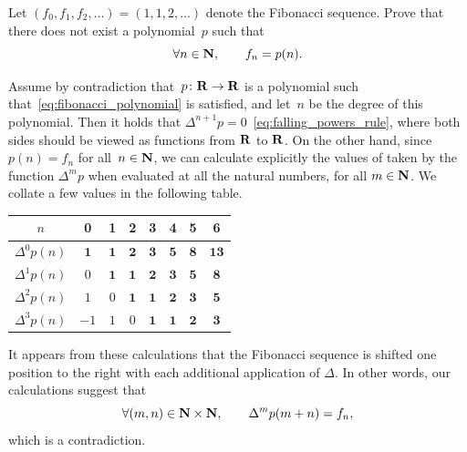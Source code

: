 \begin{exercise}
    Let $(f_0, f_1, f_2, \dotsc) = (1, 1, 2, \dotsc)$ denote the Fibonacci sequence.
    Prove that there does not exist a polynomial~$p$ such that
    \begin{equation}
        \label{eq:fibonacci_polynomial}
        \forall n \in \mathbf N, \qquad
        f_n = p(n).
    \end{equation}
\end{exercise}
\begin{solution}
    Assume by contradiction that~$p\colon \mathbf R \to \mathbf R$ is a polynomial such that~\eqref{eq:fibonacci_polynomial} is satisfied,
    and let~$n$ be the degree of this polynomial.
    Then it holds that $\Delta^{n+1} p = 0$~\eqref{eq:falling_powers_rule},
    where both sides should be viewed as functions from $\mathbf R$ to $\mathbf R$.
    On the other hand,
    since $p(n) = f_n$ for all~$n\in \mathbf N$,
    we can calculate explicitly the values of taken by the function $\Delta^{m} p$ when evaluated at all the natural numbers,
    for all $m \in \mathbf N$.
    We collate a few values in the following table.
    \begin{center}
    \begin{tabular}{|c|c|c|c|c|c|c|c|}
        \hline
        $n$    & 0 & 1 & 2 & 3 & 4 & 5 & 6 \\ \hline
        $\Delta^0 p(n)$ & $\mathbf{1}$ & $\mathbf{1}$ & $\mathbf{2}$ & $\mathbf{3}$ & $\mathbf{5}$ & $\mathbf{8}$ & $\mathbf{13}$ \\ \hline
        $\Delta^1 p(n)$ & $0$ & $\mathbf{1}$ & $\mathbf{1}$ & $\mathbf{2}$ & $\mathbf{3}$ & $\mathbf{5}$ & $\mathbf{8}$ \\ \hline
        $\Delta^2 p(n)$ & $1$ & $0$ & $\mathbf{1}$ & $\mathbf{1}$ & $\mathbf{2}$ & $\mathbf{3}$ & $\mathbf{5}$ \\ \hline
        $\Delta^3 p(n)$ & $-1$ & $1$ & $0$ & $\mathbf{1}$ & $\mathbf{1}$ & $\mathbf{2}$ & $\mathbf{3}$ \\ \hline
    \end{tabular}
    \end{center}
    It appears from these calculations that the Fibonacci sequence is shifted one position to the right with each additional application of $\Delta$.
    In other words, our calculations suggest that
    \begin{equation}
        \label{eq:difference_fib}
        \forall (m, n) \in \mathbf N \times \mathbf N,
        \qquad \Delta^m p(m+n) = f_n,
    \end{equation}
    which is a contradiction.

\end{solution}
